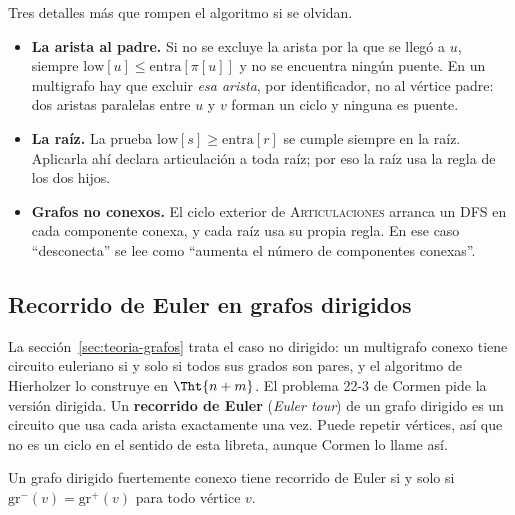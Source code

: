 \documentclass[11pt,letterpaper]{article}
\begin{document}
\begin{ojo}
  Tres detalles más que rompen el algoritmo si se olvidan.
  \begin{itemize}[itemsep=0.1em]
    \item \textbf{La arista al padre.} Si no se excluye la arista por
          la que se llegó a $u$, siempre
          $\text{low}[u] \le \text{entra}[\pi[u]]$ y no se encuentra
          ningún puente. En un multigrafo hay que excluir \emph{esa
          arista}, por identificador, no al vértice padre: dos aristas
          paralelas entre $u$ y $v$ forman un ciclo y ninguna es
          puente.
    \item \textbf{La raíz.} La prueba $\text{low}[s] \ge
          \text{entra}[r]$ se cumple siempre en la raíz. Aplicarla ahí
          declara articulación a toda raíz; por eso la raíz usa la
          regla de los dos hijos.
    \item \textbf{Grafos no conexos.} El ciclo exterior de
          \textsc{Articulaciones} arranca un DFS en cada componente
          conexa, y cada raíz usa su propia regla. En ese caso
          ``desconecta'' se lee como ``aumenta el número de componentes
          conexas''.
  \end{itemize}
\end{ojo}


\subsection*{Recorrido de Euler en grafos dirigidos}

La sección~\ref{sec:teoria-grafos} trata el caso no dirigido: un
multigrafo conexo tiene circuito euleriano si y solo si todos sus
grados son pares, y el algoritmo de Hierholzer lo construye en
$\Tht{n + m}$. El problema 22-3 de Cormen pide la versión dirigida. Un
\textbf{recorrido de Euler} (\textit{Euler tour}) de un grafo dirigido
es un circuito que usa cada arista exactamente una vez. Puede repetir
vértices, así que no es un ciclo en el sentido de esta libreta, aunque
Cormen lo llame así.

\begin{teorema}
  \label{teo:euler-dirigido-cormen}
  Un grafo dirigido fuertemente conexo tiene recorrido de Euler si y
  solo si $\text{gr}^{-}(v) = \text{gr}^{+}(v)$ para todo vértice $v$.
\end{teorema}
\end{document}
